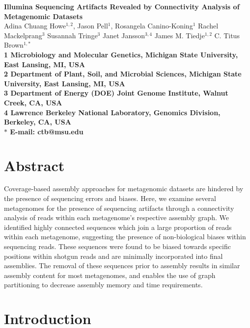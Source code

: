 \documentclass[10pt]{article}
\date{}
\begin{document}
\begin{flushleft}
{\Large \textbf{Illumina Sequencing Artifacts Revealed by Connectivity
    Analysis of Metagenomic Datasets} }
\\
Adina Chuang Howe$^{1,2}$, 
Jason Pell$^{1}$,
Rosangela Canino-Koning$^{1}$
Rachel Mackelprang$^{3}$
Susannah Tringe$^{3}$
Janet Jansson$^{3,4}$ 
James M. Tiedje$^{1,2}$
C. Titus Brown$^{1,\ast}$
\\
\bf{1} Microbiology and Molecular Genetics, Michigan State University, East Lansing, MI, USA
\\
\bf{2} Department of Plant, Soil, and Microbial Sciences, Michigan State University, East Lansing, MI, USA
\\
\bf{3} Department of Energy (DOE) Joint Genome Institute, Walnut Creek, CA, USA
\\
\bf{4} Lawrence Berkeley National Laboratory, Genomics Division, Berkeley, CA, USA
\\
$\ast$ E-mail: ctb@msu.edu
\end{flushleft}

\section*{Abstract}

Coverage-based assembly approaches for metagenomic datasets are
hindered by the presence of sequencing errors and biases.  Here, we
examine several metagenomes for the presence of sequencing
artifacts through a connectivity analysis of reads within
each metagenome's respective assembly graph.  We
identified highly connected sequences which join a large proportion of
reads within each metagenome, suggesting the presence of
non-biological biases within sequencing reads.  These sequences were
found to be biased towards specific positions within shotgun reads and
are minimally incorporated into final assemblies.  The removal of
these sequences prior to assembly results in similar assembly content
for most metagenomes, and enables the use of graph partitioning
to decrease assembly memory and time requirements.

\section*{Introduction}
\end{document}
